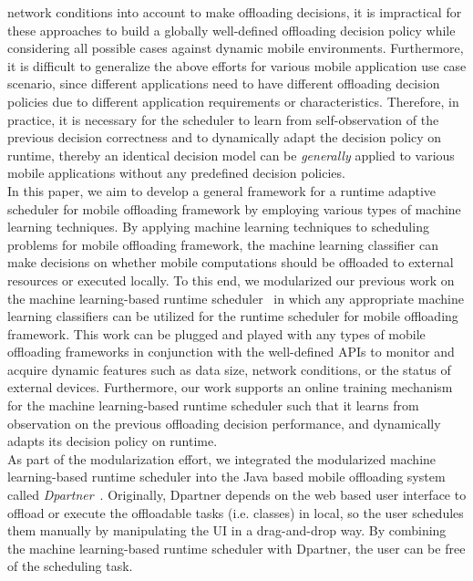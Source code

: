 \documentclass[10pt, conference, compsocconf]{IEEEtran}
\begin{document}
network conditions into account to make offloading decisions, it is
impractical for these approaches to build a globally well-defined
offloading decision policy while considering all possible cases against
dynamic mobile environments.
%
Furthermore, it is difficult to generalize the above efforts for various
mobile application use case scenario, since different applications need
to have different offloading decision policies due to different
application requirements or characteristics.
%
Therefore, in practice, it is necessary for the scheduler to learn
from self-observation of the previous decision correctness and to
dynamically adapt the decision policy on runtime, thereby an identical
decision model can be \textit{generally} applied to various mobile
applications without any predefined decision policies.\\
%
\indent In this paper, we aim to develop a general framework for a
runtime adaptive scheduler for mobile offloading framework by
employing various types of machine learning techniques.
%
By applying machine learning techniques to scheduling problems
for mobile offloading framework, the machine learning classifier can
make decisions on whether mobile computations should be offloaded to
external resources or executed locally.
%
To this end, we modularized our previous work on the machine
learning-based runtime scheduler~\cite{ml} in which any appropriate
machine learning classifiers can be utilized for the runtime scheduler
for mobile offloading framework.
%
This work can be plugged and played with any types of mobile offloading
frameworks in conjunction with the well-defined APIs to monitor and
acquire dynamic features such as data size, network conditions, or the
status of external devices. 
%
Furthermore, our work supports an online training mechanism for
the machine learning-based runtime scheduler such that it learns from
observation on the previous offloading decision performance, and
dynamically adapts its decision policy on runtime.\\
%
\indent As part of the modularization effort, we integrated the
modularized machine learning-based runtime scheduler into the Java based
mobile offloading system called \textit{Dpartner}~\cite{dpartner}.
%
Originally, Dpartner depends on the web based user interface to offload
or execute the offloadable tasks (i.e. classes) in local, so the user
schedules them manually by manipulating the UI in a drag-and-drop way.  
%
By combining the machine learning-based runtime scheduler with Dpartner,
the user can be free of the scheduling task.
\end{document}

